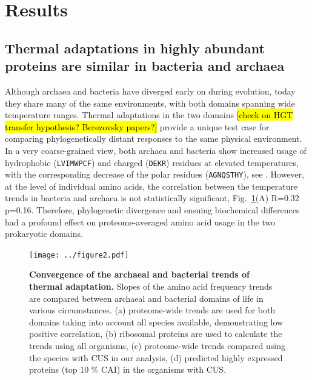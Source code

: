 \documentclass[10pt,letterpaper]{article}
\begin{document}
\section*{Results}

\subsection*{Thermal adaptations in highly abundant proteins are similar in bacteria and archaea}

Although archaea and bacteria have diverged early on during evolution, today they share many of the same environments, with both domains spanning wide temperature ranges. Thermal adaptations in the two domains \hl{[check on HGT transfer hypothesis? Berezovsky papers?]} provide a unique test case for comparing phylogenetically distant responses to the same physical environment. In a very coarse-grained view, both archaea and bacteria show increased usage of hydrophobic (\texttt{LVIMWPCF}) and charged (\texttt{DEKR}) residues at elevated temperatures, with the corresponding decrease of the polar residues (\texttt{AGNQSTHY}), see . However, at the level of individual amino acids, the correlation between the temperature trends in bacteria and archaea is not statistically significant, Fig.~\ref{fig:fig2}(A) R=0.32 p=0.16.  Therefore, phylogenetic divergence and ensuing biochemical differences had a profound effect on proteome-averaged amino acid usage in the two prokaryotic domains. 


\begin{figure}[h!]
\texttt{[image: ../figure2.pdf]}
\caption{
{\bf Convergence of the archaeal and bacterial trends of thermal adaptation.} Slopes of the amino acid frequency trends are compared between archaeal and bacterial domains of life in various circumstances.
(a) proteome-wide trends are used for both domains taking into account all species available, demonstrating low positive correlation,
(b) ribosomal proteins are used to calculate the trends using all organisms,
(c) proteome-wide trends compared using the species with CUS in our analysis,
(d) predicted highly expressed proteins (top 10 \% CAI) in the organisms with CUS.
}
\label{fig:fig2}
\end{figure}
\end{document}
